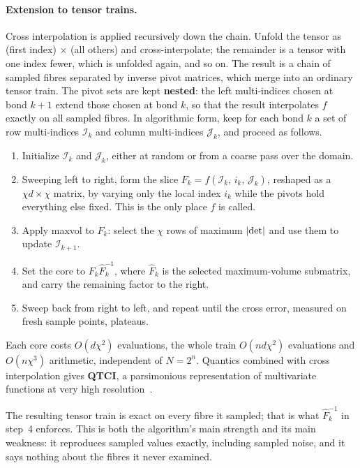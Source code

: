 \paragraph{Extension to tensor trains.}
Cross interpolation is applied recursively down the chain. Unfold the tensor as
(first index) $\times$ (all others) and cross-interpolate; the remainder is a
tensor with one index fewer, which is unfolded again, and so on. The result is a
chain of sampled fibres separated by inverse pivot matrices, which merge into an
ordinary tensor train. The pivot sets are kept \textbf{nested}: the left
multi-indices chosen at bond $k+1$ extend those chosen at bond $k$, so that the
result interpolates $f$ exactly on all sampled fibres. In algorithmic form, keep
for each bond $k$ a set of row multi-indices $\mathcal{I}_k$ and column
multi-indices $\mathcal{J}_k$, and proceed as follows.
\begin{enumerate}
  \item Initialize $\mathcal{I}_k$ and $\mathcal{J}_k$, either at random or from
    a coarse pass over the domain.
  \item Sweeping left to right, form the slice
    $F_k = f(\mathcal{I}_k,\, i_k,\, \mathcal{J}_k)$, reshaped as a
    $\chi d \times \chi$ matrix, by varying only the local index $i_k$ while the
    pivots hold everything else fixed. This is the only place $f$ is called.
  \item Apply maxvol to $F_k$: select the $\chi$ rows of maximum $\left|\det\right|$
    and use them to update $\mathcal{I}_{k+1}$.
  \item Set the core to $F_k \hat{F}_k^{-1}$, where $\hat{F}_k$ is the selected
    maximum-volume submatrix, and carry the remaining factor to the right.
  \item Sweep back from right to left, and repeat until the cross error,
    measured on fresh sample points, plateaus.
\end{enumerate}
Each core costs $O(d\chi^2)$ evaluations, the whole train $O(nd\chi^2)$
evaluations and $O(n\chi^3)$ arithmetic, independent of $N = 2^n$. Quantics
combined with cross interpolation gives \textbf{QTCI}, a parsimonious
representation of multivariate functions at very high
resolution~\cite{Ritter2024}.

\begin{remark}
  The resulting tensor train is exact on every fibre it sampled; that is what
  $\hat{F}_k^{-1}$ in step~4 enforces. This is both the algorithm's main
  strength and its main weakness: it reproduces sampled values exactly,
  including sampled noise, and it says nothing about the fibres it never
  examined.
\end{remark}

